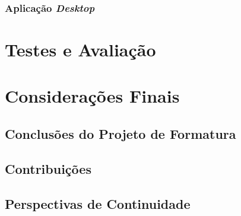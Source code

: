 \documentclass[twosideprint]{politex}
\begin{document}
    \subsection{Aplicação \textit{Desktop}}

\chapter{Testes e Avaliação}
\chapter{Considerações Finais}
	\section{Conclusões do Projeto de Formatura}
	\section{Contribuições}
	\section{Perspectivas de Continuidade}
	





%








\end{document}
